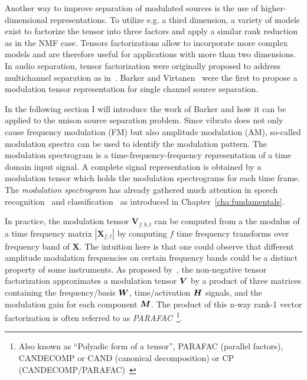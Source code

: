 
Another way to improve separation of modulated sources is the use of higher-dimensional representations.
To utilize e.g. a third dimension, a variety of models exist to factorize the tensor into three factors and apply a similar rank reduction as in the NMF case.
Tensors factorizations allow to incorporate more complex models and are therefore useful for applications with more than two dimensions.
In audio separation, tensor factorization were originally proposed to address multichannel separation as in~\cite{fitzgerald08, fevotte10, ozerov11}. 
Barker and Virtanen~\cite{barker13} were the first to propose a modulation tensor representation for single channel source separation. 
\par
In the following section I will introduce the work of Barker and how it can be applied to the unison source separation problem.
Since vibrato does not only cause frequency modulation (FM) but also amplitude modulation (AM), so-called modulation spectra can be used to identify the modulation pattern. 
The modulation spectrogram is a time-frequency-frequency representation of a time domain input signal.
A complete signal representation is obtained by a modulation tensor which holds the modulation spectrograms for each time frame.
The \emph{modulation spectrogram} has already gathered much attention in speech recognition~\cite{greenberg97, kingsbury98} and classification~\cite{kinnunen08, markaki09} as introduced in Chapter~\ref{cha:fundamentals}.
\par
In practice, the modulation tensor \(\mathbf{V}_{f, b, t}\) can be computed from a the modulus of a time frequency matrix \(| \mathbf{X}_{f, t} |\) by computing \(f\) time frequency transforms over frequency band of \(\mathbf{X}\).
The intuition here is that one could observe that different amplitude modulation frequencies on certain frequency bands could be a distinct property of some instruments.
As proposed by~\cite{barker13}, the non-negative tensor factorization approximates a modulation tensor \({\bm{V}}\) by a product of three matrices containing the frequency/basis \({\bm{W}}\), time/activation \({\bm{H}}\) signals, and the modulation gain for each component \({\bm{M}}\).
The product of this n-way rank-1 vector factorization is often referred to as \emph{PARAFAC}~\footnote{Also known as ``Polyadic form of a tensor'', PARAFAC (parallel factors), CANDECOMP or CAND (canonical decomposition) or CP (CANDECOMP/PARAFAC)~\cite{kolda09}}.

